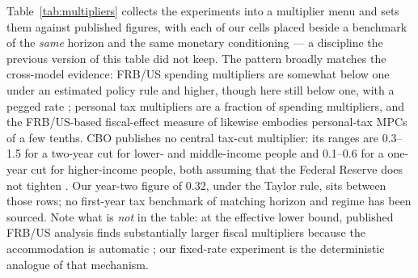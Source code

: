 Table~\ref{tab:multipliers} collects the experiments into a multiplier menu and sets them against published figures, with each of our cells placed beside a benchmark of the \emph{same} horizon and the same monetary conditioning --- a discipline the previous version of this table did not keep. The pattern broadly matches the cross-model evidence: FRB/US spending multipliers are somewhat below one under an estimated policy rule and higher, though here still below one, with a pegged rate \citep{coenen2012effects}; personal tax multipliers are a fraction of spending multipliers, and the FRB/US-based fiscal-effect measure of \citet{cashin2018fiscal} likewise embodies personal-tax MPCs of a few tenths. CBO publishes no central tax-cut multiplier: its ranges are 0.3--1.5 for a two-year cut for lower- and middle-income people and 0.1--0.6 for a one-year cut for higher-income people, both assuming that the Federal Reserve does not tighten \citep[Table~3]{cbo2015arra}. Our year-two figure of 0.32, under the Taylor rule, sits between those rows; no first-year tax benchmark of matching horizon and regime has been sourced. Note what is \emph{not} in the table: at the effective lower bound, published FRB/US analysis finds substantially larger fiscal multipliers because the accommodation is automatic \citep{reifschneider2000three, coenen2012effects}; our fixed-rate experiment is the deterministic analogue of that mechanism.

